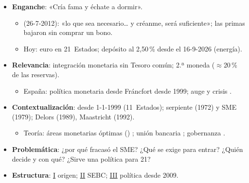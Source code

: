 \documentclass{article}
\begin{document}
\cabecerarepaso
\begin{columnas}

\begin{itemize}
\item \textbf{Enganche}: «Cría fama y échate a dormir».
  \begin{itemize}
  \item {} (26-7-2012): «lo que sea necesario… y créanme, será suficiente»; las primas bajaron sin comprar un bono.
  \item Hoy: euro en 21~Estados; depósito al 2,50\,\% desde el 16-9-2026 (energía).
  \end{itemize}
\item \textbf{Relevancia}: integración monetaria sin Tesoro común; 2.ª moneda ($\approx$20\,\% de las reservas).
  \begin{itemize}
  \item España: política monetaria desde Fráncfort desde 1999; auge y crisis .
  \end{itemize}
\item \textbf{Contextualización}:  desde 1-1-1999 (11~Estados); serpiente (1972) y SME (1979); Delors (1989), Maastricht (1992).
  \begin{itemize}
  \item Teoría: áreas monetarias óptimas () ; unión bancaria ; gobernanza .
  \end{itemize}
\item \textbf{Problemática}: ¿por qué fracasó el SME? ¿Qué se exige para entrar? ¿Quién decide y con qué? ¿Sirve una política para 21?
\item \textbf{Estructura}: \hyperref[rep:I]{I} origen; \hyperref[rep:II]{II} SEBC; \hyperref[rep:III]{III} política desde 2009.
\end{itemize}


\end{columnas}
\end{document}
